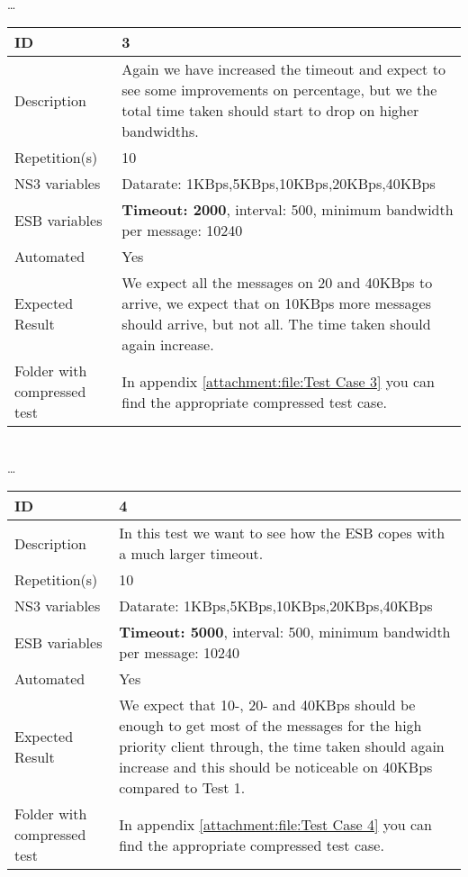 \begin{center}
\\ \ldots \\

\begin{tabular}{| p{4cm} | p{8cm} |}%
	\hline
	ID & 3 \\
	\hline
	Description & Again we have increased the timeout and expect to see some improvements on percentage, but we the total time taken should start to drop on higher bandwidths.  \\
	\hline
	Repetition(s) & 10 \\
	\hline
	NS3 variables & Datarate: 1KBps,5KBps,10KBps,20KBps,40KBps \\
	\hline
	ESB variables & \textbf{Timeout: 2000}, interval: 500, minimum bandwidth per message: 10240 \\
	\hline
	Automated & Yes \\
	\hline
	Expected Result & We expect all the messages on 20 and 40KBps to arrive, we expect that on 10KBps more messages should arrive, but not all. The time taken should again increase. \\
	\hline
	Folder with compressed test & In appendix \ref{attachment:file:Test Case 3} you can find the appropriate compressed test case.\\
	\hline
\end{tabular}

\\ \ldots \\

\begin{tabular}{| p{4cm} | p{8cm} |}%
	\hline
	ID & 4 \\
	\hline
	Description & In this test we want to see how the ESB copes with a much larger timeout.  \\
	\hline
	Repetition(s) & 10 \\
	\hline
	NS3 variables & Datarate: 1KBps,5KBps,10KBps,20KBps,40KBps \\
	\hline
	ESB variables & \textbf{Timeout: 5000}, interval: 500, minimum bandwidth per message: 10240 \\
	\hline
	Automated & Yes \\
	\hline
	Expected Result & We expect that 10-, 20- and 40KBps should be enough to get most of the messages for the high priority client through, the time taken should again increase and this should be noticeable on 40KBps compared to Test 1.  \\
	\hline
	Folder with compressed test & In appendix \ref{attachment:file:Test Case 4} you can find the appropriate compressed test case.\\
	\hline
\end{tabular}


\end{center}
